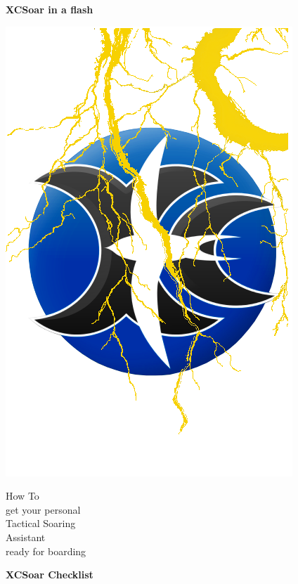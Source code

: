
\setcounter{secnumdepth}{1}
\renewcommand*{\thesection}{\textsf{\arabic{section}}}

\pagestyle{empty}
\vspace*{2em}
\begin{center}
{\Huge\textbf{XCSoar in a flash}}

\vspace{0.1em}
\includegraphics[angle=0,width=0.5\linewidth,keepaspectratio='true']{figures/blitzlogo.png}

\vspace{4em}
{\Huge How To\\}
\vspace{0.3em}
{\tiny get your personal\\}
{\Huge Tactical Soaring\\ Assistant\\}
{\tiny ready for boarding}
\end{center}

\newpage
{}
\pagestyle{fancy}
\begin{center}
{\Huge\textbf{XCSoar Checklist}}
\end{center}
